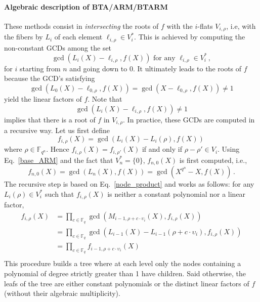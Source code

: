 \documentclass{article}
\newcommand{\ff}[1]{\mathbb{F}_{#1}}
\newcommand{\qq}{q}
\newcommand{\nn}{n}
\newcommand{\qn}{{\qq^\nn}}
\newcommand{\basef}{\ff{\qq}}
\newcommand{\extf}{\ff{\qn}}
\begin{document}
\paragraph{Algebraic description of BTA/ARM/BTARM} These methods consist in \emph{intersecting} the roots of $f$ with the $i$-flats $V_{i,\rho}$, i.e, with the fibers by $L_i$ of each element $\ell_{i,\rho} \in V_i^\ast$.
This is achieved by computing the non-constant GCDs among the set
\begin{equation}
\label{base_ARM}
\gcd(L_i(X)-\ell_{i,\rho},f(X)) \mbox{ for any } \ell_{i,\rho} \in V_i^\ast\,,
\end{equation}
for $i$ starting from $n$ and going down to 0.
It ultimately leads to the roots of $f$ because the GCD's satisfying
$$\gcd(L_0(X)-\ell_{0,\rho},f(X))=\gcd(X-\ell_{0,\rho},f(X)) \ne 1$$
yield the linear factors of $f$.
Note that
\begin{equation}
\label{eq:duality-gcd}
\gcd(L_i(X)-\ell_{i,\rho},f(X)) \ne 1
\end{equation}
implies that there is a root of $f$ in $V_{i,\rho}$.
In practice, these GCDs are computed in a recursive way. Let us first define
\begin{equation}
  \label{eq:f_i,rho_def}
  f_{i,\rho}(X)=\gcd(L_i(X)-L_i(\rho),f(X))\,  
\end{equation}
where $\rho \in \extf$. Hence $f_{i,\rho}(X)=f_{i,\rho'}(X)$ if and only if $\rho-\rho' \in V_i$.
Using Eq.~\eqref{base_ARM} and the fact that $V_n^\ast=\{0\}$, $f_{n,0}(X)$ is first computed, i.e.,
$$f_{n,0}(X)=\gcd(L_n(X),f(X))=\gcd(X^{q^\nn}-X,f(X))\,.$$
The recursive step is based on Eq.~\eqref{node_product} and works as follows: for any $L_i(\rho) \in V_i^\ast$ such that $f_{i,\rho}(X)$ is neither a constant polynomial nor a linear factor,
\begin{equation}
\label{eq:f_i,rho_rec}
\begin{aligned}
f_{i,\rho}(X)&=\prod_{c \in \basef} \gcd(M_{i-1,\rho+c \cdot \upsilon_i}(X),f_{i,\rho}(X)) \\
&=\prod_{c \in \basef} \gcd(L_{i-1}(X)-L_{i-1}(\rho+c \cdot \upsilon_i),f_{i,\rho}(X)) \\
&=\prod_{c \in \basef} f_{i-1,\rho+c \cdot \upsilon_i}(X)\\
\end{aligned}
\end{equation}
This procedure builds a tree where at each level only the nodes containing a polynomial of degree strictly greater than 1 have children. Said otherwise, the leafs of the tree are either constant polynomials or the distinct linear factors of $f$ (without their algebraic multiplicity).
\end{document}
